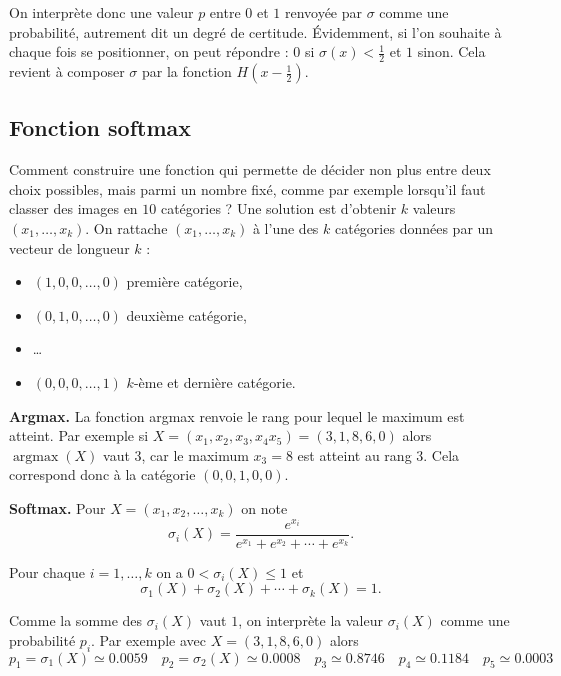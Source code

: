 \documentclass[11pt,class=report,crop=false]{standalone}
\begin{document}
On interprète donc une valeur $p$ entre $0$ et $1$ renvoyée par $\sigma$ comme une probabilité, autrement dit un degré de certitude.
Évidemment, si l'on souhaite à chaque fois se positionner, on peut répondre : $0$ si $\sigma(x) < \frac12$ et $1$ sinon.
Cela revient à composer $\sigma$ par la fonction $H(x-\frac12)$. 


\subsection{Fonction softmax}

Comment construire une fonction qui permette de décider non plus entre deux choix possibles, mais parmi un nombre fixé, comme par exemple lorsqu'il faut classer des images en $10$ catégories ?
Une solution est d'obtenir $k$ valeurs $(x_1,\ldots,x_k)$. On rattache $(x_1,\ldots,x_k)$ à l'une des $k$ catégories données par un vecteur de longueur $k$ :
\begin{itemize}
  \item $(1,0,0,\ldots,0)$ première catégorie,
  \item $(0,1,0,\ldots,0)$ deuxième catégorie,
  \item \ldots
  \item $(0,0,0,\ldots,1)$ $k$-ème et dernière catégorie.
\end{itemize}

\textbf{Argmax.}
La fonction argmax renvoie le rang pour lequel le maximum est atteint.
Par exemple si $X = (x_1,x_2,x_3,x_4x_5) = (3,1,8,6,0)$ alors 
$\operatorname{argmax}(X)$ vaut $3$, car le maximum $x_3 = 8$ est atteint au rang $3$.
Cela correspond donc à la catégorie $(0,0,1,0,0)$.

\textbf{Softmax.}
Pour $X = (x_1,x_2,\ldots,x_k)$ on note
$$\sigma_i (X) = \frac{e^{x_i}}{ e^{x_1} + e^{x_2} + \cdots + e^{x_k}}.$$

\begin{proposition}
Pour chaque $i=1,\ldots,k$ on a 
$0 < \sigma_i(X) \le 1$ et 
$$\sigma_1(X) + \sigma_2(X) + \cdots + \sigma_k(X)=1.$$
\end{proposition}

Comme la somme des $\sigma_i(X)$ vaut $1$, on interprète la valeur $\sigma_i(X)$ comme une probabilité $p_i$.
Par exemple avec $X = (3,1,8,6,0)$ alors
$$
p_1 = \sigma_1(X) \simeq 0.0059 \quad
p_2 = \sigma_2(X) \simeq 0.0008 \quad
p_3 \simeq 0.8746 \quad
p_4 \simeq 0.1184 \quad
p_5 \simeq 0.0003$$
\end{document}
